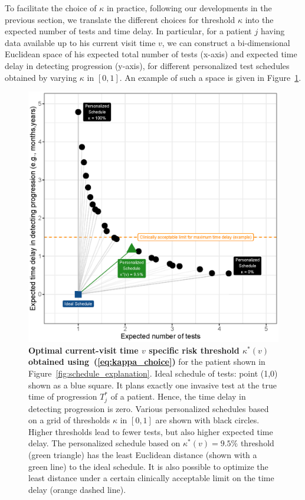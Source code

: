 To facilitate the choice of $\kappa$ in practice, following our developments in the previous section, we translate the different choices for threshold $\kappa$ into the expected number of tests and time delay. In particular, for a patient $j$ having data available up to his current visit time $v$, we can construct a bi-dimensional Euclidean space of his expected total number of tests (x-axis) and expected time delay in detecting progression (y-axis), for different personalized test schedules obtained by varying $\kappa$ in $[0, 1]$. An example of such a space is given in Figure~\ref{fig:kappa_choice}.
\begin{figure}
\centerline{\includegraphics{images/kappa_choice_102.eps}}
\caption{\textbf{Optimal current-visit time $v$ specific risk threshold $\kappa^*(v)$ obtained using~(\ref{eq:kappa_choice})} for the patient shown in Figure~\ref{fig:schedule_explanation}. Ideal schedule of tests: point (1,0) shown as a blue square. It plans exactly one invasive test at the true time of progression $T^*_j$ of a patient. Hence, the time delay in detecting progression is zero. Various personalized schedules based on a grid of thresholds $\kappa$ in $[0,1]$ are shown with black circles. Higher thresholds lead to fewer tests, but also higher expected time delay. The personalized schedule based on $\kappa^*(v)=9.5\%$ threshold (green triangle) has the least Euclidean distance (shown with a green line) to the ideal schedule. It is also possible to optimize the least distance under a certain clinically acceptable limit on the time delay (orange dashed line).}
\label{fig:kappa_choice}
\end{figure}

